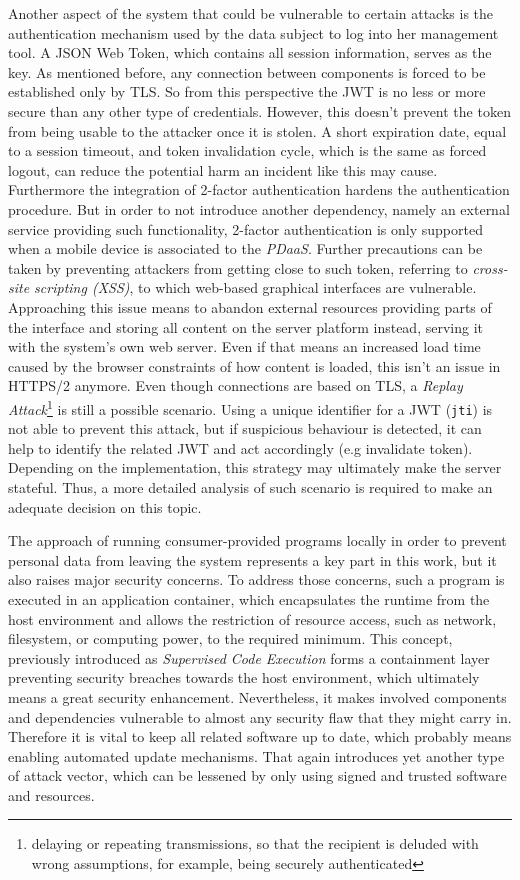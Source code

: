 \documentclass[12pt,english,a4paper,titlepage,cleardoublepage=empty,dottedtoc]{report}
\begin{document}
Another aspect of the system that could be vulnerable to certain attacks
is the authentication mechanism used by the data subject to log into her
management tool. A JSON Web Token, which contains all session
information, serves as the key. As mentioned before, any connection
between components is forced to be established only by TLS. So from this
perspective the JWT is no less or more secure than any other type of
credentials. However, this doesn't prevent the token from being usable
to the attacker once it is stolen. A short expiration date, equal to a
session timeout, and token invalidation cycle, which is the same as
forced logout, can reduce the potential harm an incident like this may
cause. Furthermore the integration of 2-factor authentication hardens
the authentication procedure. But in order to not introduce another
dependency, namely an external service providing such functionality,
2-factor authentication is only supported when a mobile device is
associated to the \emph{PDaaS}. Further precautions can be taken by
preventing attackers from getting close to such token, referring to
\emph{cross-site scripting (XSS)}, to which web-based graphical
interfaces are vulnerable. Approaching this issue means to abandon
external resources providing parts of the interface and storing all
content on the server platform instead, serving it with the system's own
web server. Even if that means an increased load time caused by the
browser constraints of how content is loaded, this isn't an issue in
HTTPS/2 anymore. Even though connections are based on TLS, a
\emph{Replay Attack}\footnote{delaying or repeating transmissions, so
  that the recipient is deluded with wrong assumptions, for example,
  being securely authenticated} is still a possible scenario. Using a
unique identifier for a JWT (\texttt{jti}) is not able to prevent this
attack, but if suspicious behaviour is detected, it can help to identify
the related JWT and act accordingly (e.g invalidate token). Depending on
the implementation, this strategy may ultimately make the server
stateful. Thus, a more detailed analysis of such scenario is required to
make an adequate decision on this topic.

The approach of running consumer-provided programs locally in order to
prevent personal data from leaving the system represents a key part in
this work, but it also raises major security concerns. To address those
concerns, such a program is executed in an application container, which
encapsulates the runtime from the host environment and allows the
restriction of resource access, such as network, filesystem, or
computing power, to the required minimum. This concept, previously
introduced as \emph{Supervised Code Execution} forms a containment layer
preventing security breaches towards the host environment, which
ultimately means a great security enhancement. Nevertheless, it makes
involved components and dependencies vulnerable to almost any security
flaw that they might carry in. Therefore it is vital to keep all related
software up to date, which probably means enabling automated update
mechanisms. That again introduces yet another type of attack vector,
which can be lessened by only using signed and trusted software and
resources.
\end{document}
